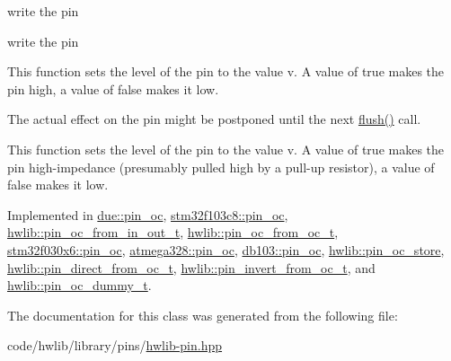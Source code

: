 write the pin

write the pin

This function sets the level of the pin to the value v. A value of true makes the pin high, a value of false makes it low.

The actual effect on the pin might be postponed until the next \hyperlink{classhwlib_1_1pin__oc_a021036a4566c712e43250ddd28a85e54}{flush()} call.

This function sets the level of the pin to the value v. A value of true makes the pin high-\/impedance (presumably pulled high by a pull-\/up resistor), a value of false makes it low. 

Implemented in \hyperlink{classdue_1_1pin__oc_ae79fc294d52d1d7c69117af5ffd81316}{due\+::pin\+\_\+oc}, \hyperlink{classstm32f103c8_1_1pin__oc_a9e5f3ecc1c5aff4b4277ea33d26ef0c7}{stm32f103c8\+::pin\+\_\+oc}, \hyperlink{classhwlib_1_1pin__oc__from__in__out__t_a5bd43e42810402353b4e902579055ef0}{hwlib\+::pin\+\_\+oc\+\_\+from\+\_\+in\+\_\+out\+\_\+t}, \hyperlink{classhwlib_1_1pin__oc__from__oc__t_a0ada22e9e4452523de2b89b6b049c10b}{hwlib\+::pin\+\_\+oc\+\_\+from\+\_\+oc\+\_\+t}, \hyperlink{classstm32f030x6_1_1pin__oc_a08be59f5868ae70133e95d172318043b}{stm32f030x6\+::pin\+\_\+oc}, \hyperlink{classatmega328_1_1pin__oc_a9eb229792f730515636057cd97609b43}{atmega328\+::pin\+\_\+oc}, \hyperlink{classdb103_1_1pin__oc_a77912a9a646cb67030854d69d911acbd}{db103\+::pin\+\_\+oc}, \hyperlink{classhwlib_1_1pin__oc__store_a160171c403e03d8abdc7480bc7475dff}{hwlib\+::pin\+\_\+oc\+\_\+store}, \hyperlink{classhwlib_1_1pin__direct__from__oc__t_a46ed21095c419bb3a8b720f3a8b00811}{hwlib\+::pin\+\_\+direct\+\_\+from\+\_\+oc\+\_\+t}, \hyperlink{classhwlib_1_1pin__invert__from__oc__t_a60831a081f8f796a47e41a87bef8a398}{hwlib\+::pin\+\_\+invert\+\_\+from\+\_\+oc\+\_\+t}, and \hyperlink{classhwlib_1_1pin__oc__dummy__t_a85fd03ccea573743545a33c131d2674d}{hwlib\+::pin\+\_\+oc\+\_\+dummy\+\_\+t}.



The documentation for this class was generated from the following file\+:\begin{DoxyCompactItemize}
\item 
code/hwlib/library/pins/\hyperlink{hwlib-pin_8hpp}{hwlib-\/pin.\+hpp}\end{DoxyCompactItemize}
